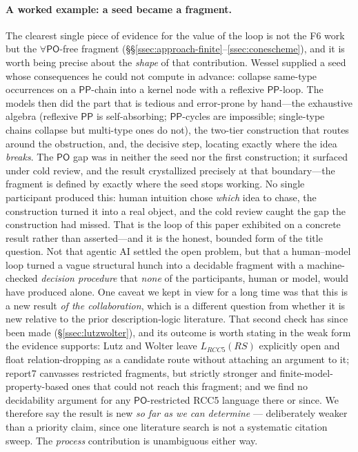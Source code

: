 \documentclass[11pt]{article}
\newcommand{\PO}{\mathsf{PO}}
\newcommand{\PP}{\mathsf{PP}}
\newcommand{\LRCC}[1]{\ensuremath{L_{\mathit{RCC#1}}}}
\theoremstyle{plain}
\theoremstyle{definition}
\begin{document}
\paragraph{A worked example: a seed became a fragment.} The clearest single
piece of evidence for the value of the loop is not the F6 work but the
$\forall\PO$-free fragment (\S\S\ref{ssec:approach-finite}--\ref{ssec:conescheme}), and it is worth
being precise about the \emph{shape} of that contribution. Wessel
supplied a seed whose consequences he could not compute in advance: collapse
same-type occurrences on a $\PP$-chain into a kernel node with a reflexive
$\PP$-loop. The models then did the part that is tedious and error-prone by
hand---the exhaustive algebra (reflexive $\PP$ is self-absorbing; $\PP$-cycles
are impossible; single-type chains collapse but multi-type ones do not), the
two-tier construction that routes around the obstruction, and, the decisive
step, locating exactly where the idea \emph{breaks}. The $\PO$ gap was in
neither the seed nor the first construction; it surfaced under cold review,
and the result crystallized precisely at that boundary---the fragment is
defined by exactly where the seed stops working. No single participant
produced this: human intuition chose \emph{which} idea to chase, the
construction turned it into a real object, and the cold review caught the gap
the construction had missed. That is the loop of this paper exhibited on a
concrete result rather than asserted---and it is the honest, bounded form of
the title question. Not that agentic AI settled the open problem, but that a
human--model loop turned a vague structural hunch into a decidable fragment
with a machine-checked \emph{decision procedure} that \emph{none} of the
participants,
human or model, would have produced alone. One caveat we kept in view for a long
time was that this is a new result \emph{of the collaboration}, which is a
different question from whether it is new relative to the prior
description-logic literature. That second check has since been made
(\S\ref{ssec:lutzwolter}), and its outcome is worth stating in the weak form
the evidence supports: Lutz and Wolter leave $\LRCC{5}(\mathit{RS})$
explicitly open and float relation-dropping as a candidate route without
attaching an argument to it; report7 canvasses restricted fragments, but
strictly stronger and finite-model-property-based ones that could not reach
this fragment; and we find no decidability argument for any $\PO$-restricted
RCC5 language there or since. We therefore say the result is new \emph{so far
as we can determine} --- deliberately weaker than a priority claim, since one
literature search is not a systematic citation sweep. The \emph{process}
contribution is unambiguous either way.
\end{document}
